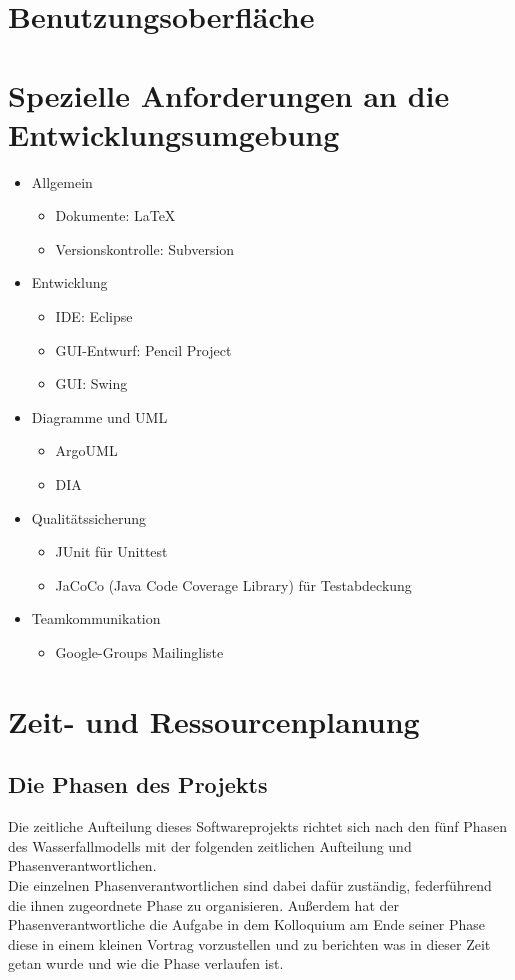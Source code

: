 \documentclass[10pt,a4paper]{article}
\begin{document}
\section{Benutzungsoberfläche}

\section{Spezielle Anforderungen an die Entwicklungsumgebung}
\begin{itemize}
	\item Allgemein
	\begin{itemize}
		\item Dokumente: \LaTeX
		\item Versionskontrolle: Subversion
	\end{itemize}
	\item Entwicklung
	\begin{itemize}
		\item IDE: Eclipse
		\item GUI-Entwurf: Pencil Project
		\item GUI: Swing
	\end{itemize}
	\item Diagramme und UML
	\begin{itemize}
		\item ArgoUML
		\item DIA
	\end{itemize}
	\item Qualitätssicherung
	\begin{itemize}
		\item JUnit für Unittest
		\item JaCoCo (Java Code Coverage Library) für Testabdeckung
	\end{itemize}
	\item Teamkommunikation
	\begin{itemize}
		\item Google-Groups Mailingliste
	\end{itemize}
\end{itemize}

\section{Zeit- und Ressourcenplanung}

\subsection{Die Phasen des Projekts}
Die zeitliche Aufteilung dieses Softwareprojekts richtet sich nach den fünf Phasen des Wasserfallmodells mit der folgenden zeitlichen Aufteilung und Phasenverantwortlichen.\\
Die einzelnen Phasenverantwortlichen sind dabei dafür zuständig, federführend die ihnen zugeordnete Phase zu organisieren. Außerdem hat der Phasenverantwortliche die Aufgabe in dem Kolloquium am Ende seiner Phase diese in einem kleinen Vortrag vorzustellen und zu berichten was in dieser Zeit getan wurde und wie die Phase verlaufen ist.\\
\end{document}
